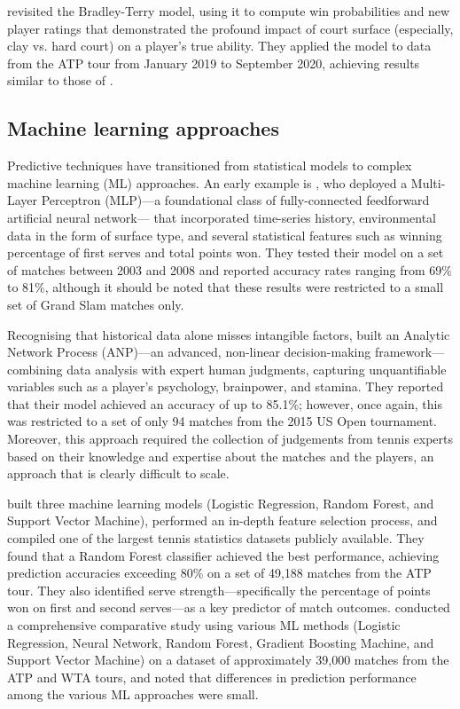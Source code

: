 \textcite{fayomi_2022} revisited the Bradley-Terry model, using it to compute win probabilities and
new player ratings that demonstrated the profound impact of court surface (especially, clay vs. hard
court) on a player's true ability. They applied the model to data from the ATP tour from January
2019 to September 2020, achieving results similar to those of \textcite{mchale_2011}.

\subsection{Machine learning approaches}

Predictive techniques have transitioned from statistical models to complex machine learning (ML)
approaches. An early example is \textcite{somboonphokkaphan_2009}, who deployed a Multi-Layer
Perceptron (MLP)---a foundational class of fully-connected feedforward artificial neural network---
that incorporated time-series history, environmental data in the form of surface type, and several
statistical features such as winning percentage of first serves and total points won. They tested
their model on a set of matches between 2003 and 2008 and reported accuracy rates ranging from
69\% to 81\%, although it should be noted that these results were restricted to a small set of Grand
Slam matches only.

Recognising that historical data alone misses intangible factors, \textcite{gu_2019} built an
Analytic Network Process (ANP)---an advanced, non-linear decision-making framework---combining
data analysis with expert human judgments, capturing unquantifiable variables such as a player's
psychology, brainpower, and stamina. They reported that their model achieved an accuracy of up to
85.1\%; however, once again, this was restricted to a set of only 94 matches from the 2015 US
Open tournament. Moreover, this approach required the collection of judgements from tennis experts
based on their knowledge and expertise about the matches and the players, an approach that is
clearly difficult to scale.

\textcite{gao_2021} built three machine learning models (Logistic Regression, Random Forest, and
Support Vector Machine), performed an in-depth feature selection process, and compiled one of the
largest tennis statistics datasets publicly available. They found that a Random Forest classifier
achieved the best performance, achieving prediction accuracies exceeding 80\% on a set of 49{,}188
matches from the ATP tour. They also identified
serve strength---specifically the percentage of points won on first and second serves---as a key
predictor of match outcomes. \textcite{wilkens_2021} conducted a comprehensive comparative study
using various ML methods (Logistic Regression, Neural Network, Random Forest, Gradient Boosting
Machine, and Support Vector Machine) on a dataset of approximately 39,000 matches from the ATP and
WTA tours,
and noted that differences in prediction performance among the various ML approaches were small.

